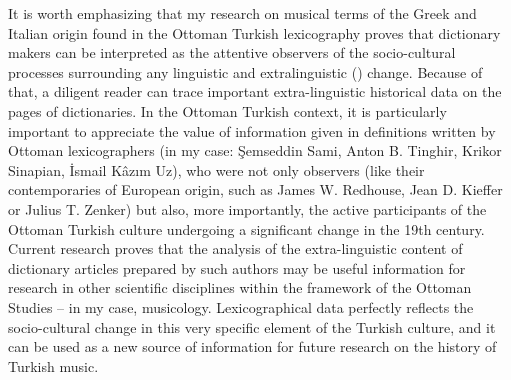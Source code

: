 \documentclass[output=paper,colorlinks,citecolor=brown,arabicfont,chinesefont]{langscibook}
\begin{document}
It is worth emphasizing that my research on musical terms of the Greek and Italian origin found in the Ottoman Turkish lexicography proves that dictionary makers can be interpreted as the attentive observers of the socio-cultural processes surrounding any linguistic \citep{Siemieniec-golas2015} and extralinguistic (\citealt{Doroszewski1970, Ligara2017}) change. Because of that, a diligent reader can trace important extra-linguistic historical data on the pages of dictionaries. In the Ottoman Turkish context, it is particularly important to appreciate the value of information given in definitions written by Ottoman lexicographers (in my case: Şemseddin Sami, Anton B. Tinghir, Krikor Sinapian, İsmail Kâzım Uz), who were not only observers (like their contemporaries of European origin, such as James W. Redhouse, Jean D. Kieffer or Julius T. Zenker) but also, more importantly, the active participants of the Ottoman Turkish culture undergoing a significant change in the 19th century. Current research proves that the analysis of the extra-linguistic content of dictionary articles prepared by such authors may be useful information for research in other scientific disciplines within the framework of the Ottoman Studies – in my case, musicology. Lexicographical data perfectly reflects the socio-cultural change in this very specific element of the Turkish culture, and it can be used as a new source of information for future research on the history of Turkish music.

{\sloppy\printbibliography[heading=subbibliography,notkeyword=this]}
\end{document}
